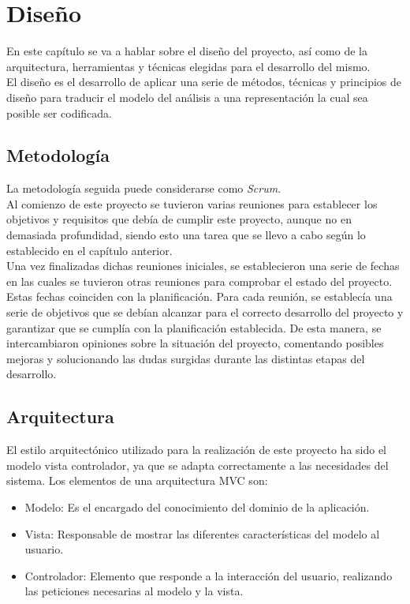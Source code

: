 \chapter{Diseño}
\label{cap:diseno}

En este capítulo se va a hablar sobre el diseño del proyecto, así como de la arquitectura, herramientas y técnicas elegidas para el desarrollo del mismo.\\

El diseño es el desarrollo de aplicar una serie de métodos, técnicas y principios de diseño para traducir el modelo del análisis a una representación la cual sea posible ser codificada.\\

\section{Metodología}

La metodología seguida puede considerarse como \textit{Scrum}.\\

Al comienzo de este proyecto se tuvieron varias reuniones para establecer los objetivos y requisitos que debía de cumplir este proyecto, aunque no en demasiada profundidad, siendo esto una tarea que se llevo a cabo según lo establecido en el capítulo anterior.\\

Una vez finalizadas dichas reuniones iniciales, se establecieron una serie de fechas en las cuales se tuvieron otras reuniones para comprobar el estado del proyecto. Estas fechas coinciden con la planificación. Para cada reunión, se establecía una serie de objetivos que se debían alcanzar para el correcto desarrollo del proyecto y garantizar que se cumplía con la planificación establecida. De esta manera, se intercambiaron opiniones sobre la situación del proyecto, comentando posibles mejoras y solucionando las dudas surgidas durante las distintas etapas del desarrollo.\\

\section{Arquitectura}

El estilo arquitectónico utilizado para la realización de este proyecto ha sido el modelo vista controlador, ya que se adapta correctamente a las necesidades del sistema.
Los elementos de una arquitectura MVC son:

\begin{itemize}
\item Modelo: Es el encargado del conocimiento del dominio de la aplicación.
\item Vista: Responsable de mostrar las diferentes características del modelo al usuario.
\item Controlador: Elemento que responde a la interacción del usuario, realizando las peticiones necesarias al modelo y la vista.
\end{itemize}

